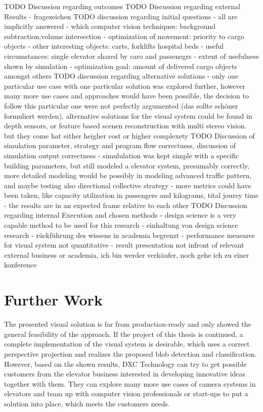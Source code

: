 TODO Discussion regarding outcomes
TODO Discussion regarding external Results - fragezeichen
TODO discussion regarding initial questions
 - all are implicitly answered
 - which computer vision techniques: background subtraction,volume intersection
 - optimization of movement: priority to cargo objects
 - other interesting objects: carts, forklifts hospital beds
 - useful circumstances: single elevator shared by caro and passenegrs
 - extent of usefulness shown by simulation
 - optimization goal: amount of delivered cargo objects amongst others
TODO discussion regarding alternative solutions
 - only one particular use case with one particular solution was explored further, however many more use cases and approaches would have been possible, the decision to follow this particular one were not perfectly argumented (das sollte schöner formuliert werden), alternative solutions for the visual system could be found in depth sensors, or feature based scenen reconstruction with multi stereo vision. but they come hat either heigher cost or higher complexety
TODO Discussion of simulation parameter, strategy and program flow correctness, discussion of simulation output correctness
- simululation was kept simple with a specific building parameters, but still modeled a elevator system, presumably correctly, more detailed modeling would be possibly in modeling advanced traffic pattern, and maybe testing also directional collective strategy
- more metrics could have been taken, like capacity utilization in passengers and kilograms, tital jourey time
- the results are in an expected frame relative to each other
TODO  Discussion regarding internal Execution and chosen methods 
- design science is a very capable method to be used for this research
- einhaltung von design science research - rückführung des wissens in academia begrenzt
- performance measures for visual system not quantitative
- result presentation not infront of relevant external business or academia, ich bin werder verkäufer, noch gehe ich zu einer konference

\section{Further Work}

The presented visual solution is far from production-ready and only showed the general feasibility of the approach.
If the project of this thesis is continued, a complete implementation of the visual system is desirable, which uses a correct perspective projection and realizes the proposed blob detection and classification.
However, based on the shown results, DXC Technology can try to get possible customers from the elevator business interested in developing innovative ideas together with them.
They can explore many more use cases of camera systems in elevators and team up with computer vision professionals or start-ups to put a solution into place, which meets the customers needs.
